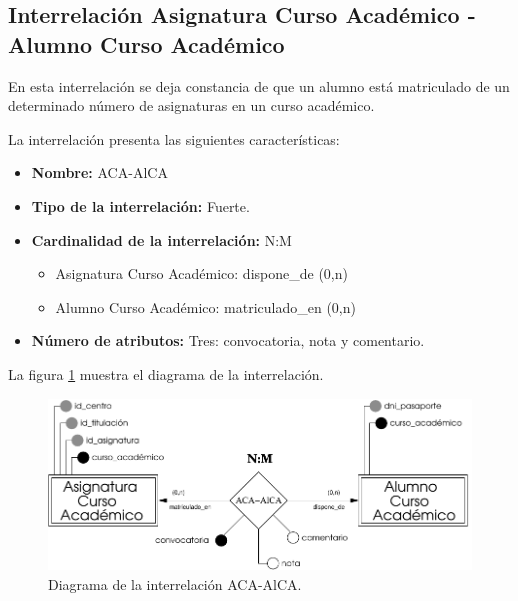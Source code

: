 \subsection{Interrelación Asignatura Curso Académico - Alumno Curso Académico}

   \begin{description}
      \item[Definición] En esta interrelación se deja constancia de que un
      alumno está matriculado de un determinado número de asignaturas en un
      curso académico.

      \item[Características] La interrelación presenta las siguientes
                             características:

         \begin{itemize}
            \item \textbf{Nombre:} ACA-AlCA
            \item \textbf{Tipo de la interrelación:} Fuerte.
            \item \textbf{Cardinalidad de la interrelación:} N:M
                  \begin{itemize}
                     \item Asignatura Curso Académico: dispone\_de (0,n)
                     \item Alumno Curso Académico: matriculado\_en (0,n)
                  \end{itemize}
            \item \textbf{Número de atributos:} Tres: convocatoria, nota y
                  comentario.
         \end{itemize}

      \item[Diagrama] La figura \ref{diagramaACA-AlCA} muestra el diagrama de la
                      interrelación.

       \item \begin{figure}[!ht]
            \begin{center}
            \includegraphics[]{07.Modelo_Entidad-Interrelacion/7.3.Analisis_Interrelaciones/diagramas/ACA-AlCA.pdf}
            \caption{Diagrama de la interrelación ACA-AlCA.}
            \label{diagramaACA-AlCA}
            \end{center}
         \end{figure}


\end{description}
